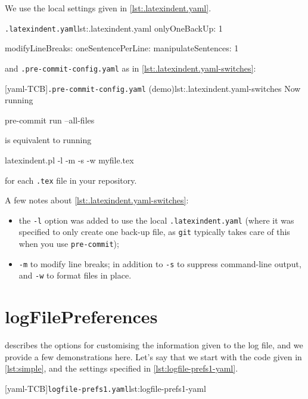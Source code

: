 		\begin{example}
			We use the local settings given in \cref{lst:.latexindent.yaml}.
			\begin{cmhlistings}[style=tcblatex]{\texttt{.latexindent.yaml}}{lst:.latexindent.yaml}
onlyOneBackUp: 1

modifyLineBreaks:
 oneSentencePerLine:
   manipulateSentences: 1
\end{cmhlistings}

			and \texttt{.pre-commit-config.yaml} as in \cref{lst:.latexindent.yaml-switches}:

			[yaml-TCB]{\texttt{.pre-commit-config.yaml} (demo)}{lst:.latexindent.yaml-switches}
			Now running
			\begin{commandshell}
pre-commit run --all-files  
\end{commandshell}
			is equivalent to running
			\begin{commandshell}
latexindent.pl -l -m -s -w myfile.tex
\end{commandshell}
			for each \texttt{.tex} file in your repository.

			A few notes about \cref{lst:.latexindent.yaml-switches}:
			\begin{itemize}
				\item the \texttt{-l} option was added to use the local \texttt{.latexindent.yaml} (where it
				      was specified to only create one back-up file, as \texttt{git} typically takes care of
				      this when you use \texttt{pre-commit});
				\item \texttt{-m} to modify line breaks; in addition to \texttt{-s} to suppress command-line
				      output, and \texttt{-w} to format files in place.
			\end{itemize}
		\end{example}

	\section{logFilePreferences}\label{app:logfile-demo}
	  describes the options for customising the information given
	 to the log file, and we provide a few demonstrations here. Let's say that we start with
	 the code given in \cref{lst:simple}, and the settings specified in
	 \cref{lst:logfile-prefs1-yaml}.

	 \begin{minipage}{.35\linewidth}
	 \end{minipage}
	 \hfill
	 \begin{minipage}{.6\linewidth}
		 [yaml-TCB]{\texttt{logfile-prefs1.yaml}}{lst:logfile-prefs1-yaml}
	 \end{minipage}


